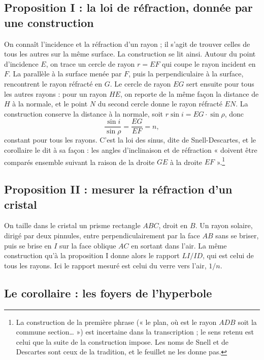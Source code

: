\documentclass[11pt,a4paper]{article}
\begin{document}
\subsection*{Proposition I : la loi de réfraction, donnée par une construction}

On connaît l'incidence et la réfraction d'un rayon ; il s'agit de trouver
celles de tous les autres sur la même surface. La construction se lit ainsi.
Autour du point d'incidence \(E\), on trace un cercle de rayon \(r=EF\) qui coupe
le rayon incident en \(F\). La parallèle à la surface menée par \(F\), puis la
perpendiculaire à la surface, rencontrent le rayon réfracté en \(G\). Le cercle
de rayon \(EG\) sert ensuite pour tous les autres rayons : pour un rayon \(HE\),
on reporte de la même façon la distance de \(H\) à la normale, et le point
\(N\) du second cercle donne le rayon réfracté \(EN\). La construction conserve
la distance à la normale, soit \(r\sin i=EG\cdot\sin\rho\), donc
\[
\frac{\sin i}{\sin\rho}=\frac{EG}{EF}=n,
\]
constant pour tous les rayons. C'est la loi des sinus, dite de
Snell-Descartes, et le corollaire le dit à sa façon : les angles
d'inclinaison et de réfraction « doivent être comparés ensemble suivant la
raison de la droite \(GE\) à la droite \(EF\) ».\footnote{La construction de
la première phrase (« le plan, où est le rayon \(ADB\) soit la commune
section… ») est incertaine dans la transcription ; le sens retenu est celui
que la suite de la construction impose. Les noms de Snell et de Descartes
sont ceux de la tradition, et le feuillet ne les donne pas.}

\subsection*{Proposition II : mesurer la réfraction d'un cristal}

On taille dans le cristal un prisme rectangle \(ABC\), droit en \(B\). Un
rayon solaire, dirigé par deux pinnules, entre perpendiculairement par la
face \(AB\) sans se briser, puis se brise en \(I\) sur la face oblique \(AC\)
en sortant dans l'air. La même construction qu'à la proposition I donne alors
le rapport \(LI/ID\), qui est celui de tous les rayons. Ici le rapport mesuré
est celui du verre vers l'air, \(1/n\).

\subsection*{Le corollaire : les foyers de l'hyperbole}
\end{document}
